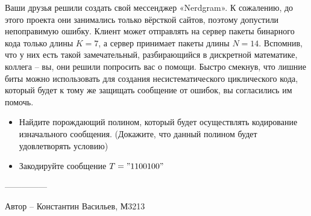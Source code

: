 \question
Ваши друзья решили создать свой мессенджер «Nerdgram». К сожалению, до этого проекта они занимались только вёрсткой сайтов, поэтому допустили непоправимую ошибку. Клиент может отправлять на сервер пакеты бинарного кода только длины $K = 7$, а сервер принимает пакеты длины $N = 14$. Вспомнив, что у них есть такой замечательный, разбирающийся в дискретной математике, коллега -- вы, они решили попросить вас о помощи. Быстро смекнув, что лишние биты можно использовать для создания несистематического циклического кода, который будет к тому же защищать сообщение от ошибок, вы согласились им помочь.
\begin{itemize}
\item Найдите порождающий полином, который будет осуществлять кодирование изначального сообщения. (Докажите, что данный полином будет удовлетворять условию)
\item Закодируйте сообщение $T = "1100100"$
\end{itemize}

---------------

Автор -- Константин Васильев, М3213